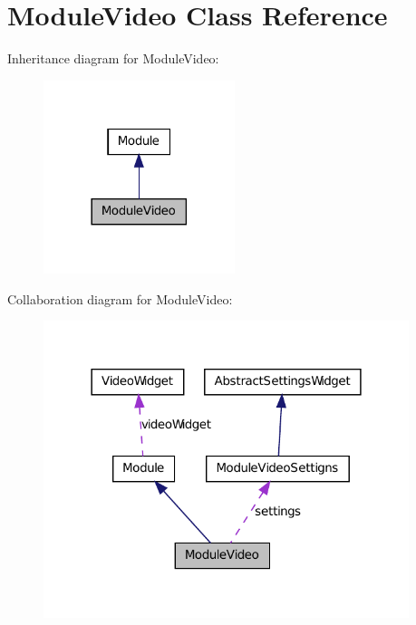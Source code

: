 \hypertarget{class_module_video}{
\section{ModuleVideo Class Reference}
\label{db/d7c/class_module_video}
}


Inheritance diagram for ModuleVideo:\nopagebreak
\begin{figure}[H]
\begin{center}
\leavevmode
\includegraphics[width=158pt]{d7/dce/class_module_video__inherit__graph}
\end{center}
\end{figure}


Collaboration diagram for ModuleVideo:
\nopagebreak
\begin{figure}[H]
\begin{center}
\leavevmode
\includegraphics[width=302pt]{d4/d89/class_module_video__coll__graph}
\end{center}
\end{figure}
